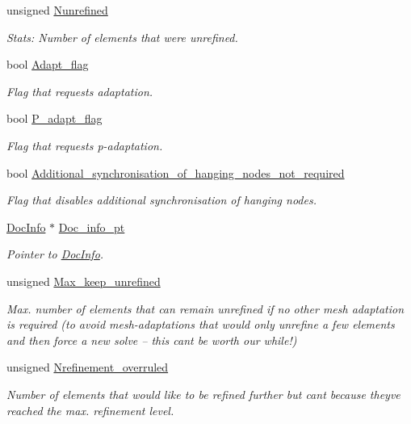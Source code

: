 \begin{DoxyCompactItemize}
unsigned \hyperlink{classoomph_1_1RefineableMeshBase_a62c0314a69b2e40355a2aa27ff5ea133}{Nunrefined}
\begin{DoxyCompactList}\small\item\em Stats\+: Number of elements that were unrefined. \end{DoxyCompactList}\item 
bool \hyperlink{classoomph_1_1RefineableMeshBase_a2bc0a1c6c011672442049d9032774ca4}{Adapt\+\_\+flag}
\begin{DoxyCompactList}\small\item\em Flag that requests adaptation. \end{DoxyCompactList}\item 
bool \hyperlink{classoomph_1_1RefineableMeshBase_a0e378a1fe248b22b813bd31505f42de2}{P\+\_\+adapt\+\_\+flag}
\begin{DoxyCompactList}\small\item\em Flag that requests p-\/adaptation. \end{DoxyCompactList}\item 
bool \hyperlink{classoomph_1_1RefineableMeshBase_a6ab22815312413547b130b2c02b95341}{Additional\+\_\+synchronisation\+\_\+of\+\_\+hanging\+\_\+nodes\+\_\+not\+\_\+required}
\begin{DoxyCompactList}\small\item\em Flag that disables additional synchronisation of hanging nodes. \end{DoxyCompactList}\item 
\hyperlink{classoomph_1_1DocInfo}{Doc\+Info} $\ast$ \hyperlink{classoomph_1_1RefineableMeshBase_a37561a1518733dc95a193e46b085f313}{Doc\+\_\+info\+\_\+pt}
\begin{DoxyCompactList}\small\item\em Pointer to \hyperlink{classoomph_1_1DocInfo}{Doc\+Info}. \end{DoxyCompactList}\item 
unsigned \hyperlink{classoomph_1_1RefineableMeshBase_a55c7480baae4082f4da4cbb48c40c623}{Max\+\_\+keep\+\_\+unrefined}
\begin{DoxyCompactList}\small\item\em Max. number of elements that can remain unrefined if no other mesh adaptation is required (to avoid mesh-\/adaptations that would only unrefine a few elements and then force a new solve -- this can\textquotesingle{}t be worth our while!) \end{DoxyCompactList}\item 
unsigned \hyperlink{classoomph_1_1RefineableMeshBase_ad52549170de34203f6b558c50ecf8f8f}{Nrefinement\+\_\+overruled}
\begin{DoxyCompactList}\small\item\em Number of elements that would like to be refined further but can\textquotesingle{}t because they\textquotesingle{}ve reached the max. refinement level. \end{DoxyCompactList}\end{DoxyCompactItemize}
